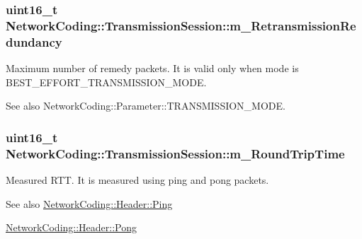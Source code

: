 \subsubsection[{\texorpdfstring{m\+\_\+\+Retransmission\+Redundancy}{m_RetransmissionRedundancy}}]{\setlength{\rightskip}{0pt plus 5cm}uint16\+\_\+t Network\+Coding\+::\+Transmission\+Session\+::m\+\_\+\+Retransmission\+Redundancy}\hypertarget{class_network_coding_1_1_transmission_session_a3b8bbbaab2050d0c5a47ecec913bada4}{}\label{class_network_coding_1_1_transmission_session_a3b8bbbaab2050d0c5a47ecec913bada4}


Maximum number of remedy packets. It is valid only when mode is B\+E\+S\+T\+\_\+\+E\+F\+F\+O\+R\+T\+\_\+\+T\+R\+A\+N\+S\+M\+I\+S\+S\+I\+O\+N\+\_\+\+M\+O\+DE. 

\begin{DoxySeeAlso}{See also}
Network\+Coding\+::\+Parameter\+::\+T\+R\+A\+N\+S\+M\+I\+S\+S\+I\+O\+N\+\_\+\+M\+O\+DE. 
\end{DoxySeeAlso}
\subsubsection[{\texorpdfstring{m\+\_\+\+Round\+Trip\+Time}{m_RoundTripTime}}]{\setlength{\rightskip}{0pt plus 5cm}uint16\+\_\+t Network\+Coding\+::\+Transmission\+Session\+::m\+\_\+\+Round\+Trip\+Time}\hypertarget{class_network_coding_1_1_transmission_session_a7888abd5fd616a2cf7d9953b570b492c}{}\label{class_network_coding_1_1_transmission_session_a7888abd5fd616a2cf7d9953b570b492c}


Measured R\+TT. It is measured using ping and pong packets. 

\begin{DoxySeeAlso}{See also}
\hyperlink{struct_network_coding_1_1_header_1_1_ping}{Network\+Coding\+::\+Header\+::\+Ping} 

\hyperlink{struct_network_coding_1_1_header_1_1_pong}{Network\+Coding\+::\+Header\+::\+Pong} 
\end{DoxySeeAlso}
